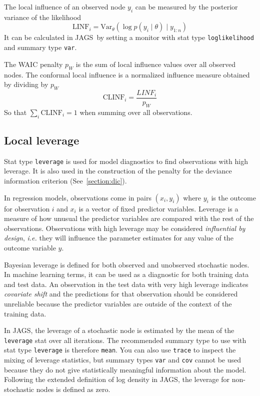 \documentclass[11pt, a4paper, titlepage]{report}
\newcommand{\JAGS}{\textsf{JAGS}}
\begin{document}
{The local influence of an observed node $y_i$ can be measured by the
posterior variance of the likelihood
\[
\text{LINF}_i = \text{Var}_{\theta} \left( \log p(y_i \mid \theta) \mid y_{1:n} \right) 
\]
It can be calculated in \JAGS\ by setting a monitor with stat type
\texttt{loglikelihood} and summary type \texttt{var}.

The WAIC penalty $p_W$ is the sum of local influence values over all
observed nodes. The conformal local influence is a normalized influence
measure obtained by dividing by $p_W$
\[
\text{CLINF}_i = \frac{LINF_i}{p_W}
\]
So that $\sum_i \text{CLINF}_i = 1$ when summing over all observations.

\subsection{Local leverage}

Stat type \texttt{leverage} is used for model diagnostics to find
observations with high leverage. It is also used in the construction
of the penalty for the deviance information criterion
(See~\ref{section:dic}).

In regression models, observations come in pairs $(x_i,y_i)$ where
$y_i$ is the outcome for observation $i$ and $x_i$ is a vector of
fixed predictor variables.  Leverage is a measure of how unusual the
predictor variables are compared with the rest of the observations.
Observations with high leverage may be considered {\em influential by
  design}, {\em i.e.} they will influence the parameter estimates for
any value of the outcome variable $y$. 

Bayesian leverage is defined for both observed and unobserved
stochastic nodes. In machine learning terms, it can be used as a
diagnostic for both training data and test data. An observation in the
test data with very high leverage indicates {\em covariate shift} and
the predictions for that observation should be considered unreliable
because the predictor variables are outside of the context of the
training data.

In \JAGS, the leverage of a stochastic node is estimated by the mean
of the \texttt{leverage} stat over all iterations. The recommended
summary type to use with stat type \texttt{leverage} is therefore
\texttt{mean}. You can also use \texttt{trace} to inspect the mixing
of leverage statistics, but summary types \texttt{var} and
\texttt{cov} cannot be used because they do not give statistically
meaningful information about the model. Following the extended
definition of log density in \JAGS, the leverage for non-stochastic
nodes is defined as zero.

}
\end{document}

